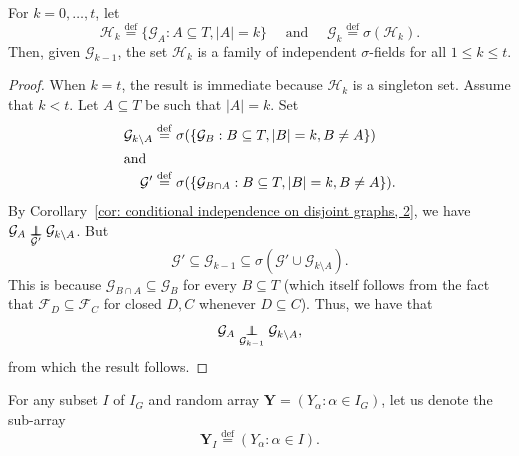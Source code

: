 \documentclass[AHL,Unicode,longabstracts,published]{cedram}
\newcommand{\independent}{\protect\mathpalette{\protect\independenT}{\perp}}\def\independenT#1#2{\mathrel{\rlap{$#1#2$}\mkern2mu{#1#2}}}
\newcommand{\alf}{\alpha}%
\newcommand*{\defeq}{\stackrel{\mathrm{def}}{=}}
\newcommand*\FF{\mathcal{F}}
\newcommand*\GG{\mathcal{G}}
\newcommand*\HH{\mathcal{H}}
\newcommand*\bY{\mathbf{Y}}
\begin{document}
\begin{coro}\label{prop:inductive joining of distributional equalities}
For $k=0,\ldots,t$, let
\[
\HH_k
\defeq \{\GG_A : A\subseteq T, |A|=k\}\quad\text{ and }\quad\GG_k
\defeq \sigma(\HH_k).
\]
Then, given $\GG_{k-1}$, the set $\HH_k$ is a {family of independent $\sigma$-fields} for all $1 \leq k \leq t$.
\end{coro}

\begin{proof}
When $k=t$, the result is immediate because $\HH_k$ is a singleton set. Assume that $k < t$. Let $A \subseteq T$ be such that $|A|=k$. Set
\begin{align*}
\GG_{k\setminus A}
&\defeq\sigma(\{\GG_B : B \subseteq T, |B|=k, B \neq A\})
\\
\intertext{and}
\GG'
&\defeq\sigma(\{\GG_{B \cap A}: B \subseteq T, |B|=k, B\neq A\}).
\end{align*}
By Corollary~\ref{cor: conditional independence on disjoint graphs, 2}, we have $\GG_A \underset{\GG'}{\independent} \GG_{k\setminus A}$. But
\[
\GG' \subseteq \GG_{k-1} \subseteq \sigma(\GG'\cup \GG_{k\setminus A}).
\]
This is because $\GG_{B \cap A} \subseteq \GG_B$ for every $B \subseteq T$ (which itself follows from the fact that $\FF_D \subseteq \FF_C$ for closed $D,C$ whenever $D \subseteq C$). Thus, we have that
\[
\GG_A \underset{\GG_{k-1}}{\independent} \GG_{k\setminus A},
\]
from which the result follows.
\end{proof}

For any subset $I$ of $I_G$ and random array $\bY = (Y_\alf : \alf \in I_G)$, let us denote the sub-array
\[
\bY_I
\defeq(Y_\alf : \alf \in I).
\]
\end{document}
